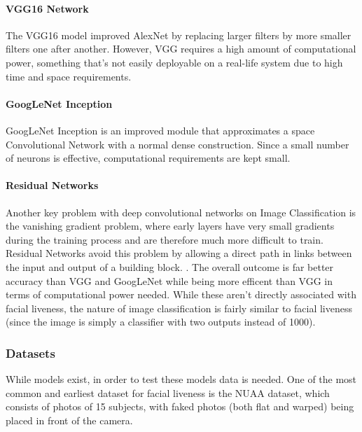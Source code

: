 \documentclass[10pt,a4paper]{article}
\begin{document}
        \paragraph{VGG16 Network}
        The VGG16 model improved AlexNet by replacing larger filters by more smaller filters one after another.
        However, VGG requires a high amount of computational power, something that's not easily deployable  on a real-life system
        due to high time and space requirements. 
        

        \paragraph{GoogLeNet Inception}
        GoogLeNet Inception is an improved module that approximates a space Convolutional Network with a normal
        dense construction. Since a small number of neurons is effective, computational requirements are kept small. 
        
        \paragraph{Residual Networks}
        Another key problem with deep convolutional networks on Image Classification is the vanishing gradient problem, where early layers have very small gradients during the training process and
        are therefore much more difficult to train. Residual Networks avoid this problem by allowing a direct path in links between the input and output of a building block. .
        The overall outcome is far better accuracy than VGG and GoogLeNet while being more efficent than VGG in terms of computational power needed. 
        While these aren't directly associated with facial liveness, the nature of image classification is fairly similar to facial liveness (since the image is simply a classifier with two outputs instead of 1000).


        \subsubsection{Datasets}
        While models exist, in order to test these models data is needed. One of the most common and earliest dataset for facial liveness is the NUAA dataset,
        which consists of photos of 15 subjects, with faked photos (both flat and warped) being placed in front of the camera. \cite{NUAADataset}
\end{document}
